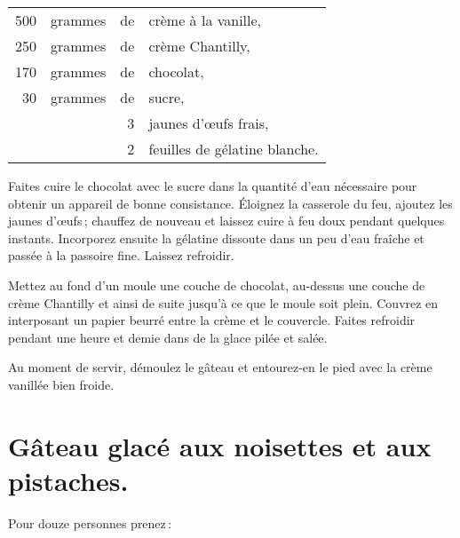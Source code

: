 \footnotesize
\begin{longtable}{rrrp{16em}}
    500 & grammes & de & crème à la vanille,                                                              \\
    250 & grammes & de & crème Chantilly,                                                                 \\
    170 & grammes & de & chocolat,                                                                        \\
     30 & grammes & de & sucre,                                                                           \\
        &         &  3 & jaunes d'œufs frais,                                                             \\
        &         &  2 & feuilles de gélatine blanche.                                                    \\
\end{longtable}
\normalsize

Faites cuire le chocolat avec le sucre dans la quantité d’eau nécessaire pour
obtenir un appareil de bonne consistance. Éloignez la casserole du feu, ajoutez
les jaunes d'œufs ; chauffez de nouveau et laissez cuire à feu doux pendant
quelques instants. Incorporez ensuite la gélatine dissoute dans un peu d'eau
fraîche et passée à la passoire fine. Laissez refroidir.

Mettez au fond d'un moule une couche de chocolat, au-dessus une couche de crème
Chantilly et ainsi de suite jusqu'à ce que le moule soit plein. Couvrez en
interposant un papier beurré entre la crème et le couvercle. Faites refroidir
pendant une heure et demie dans de la glace pilée et salée.

Au moment de servir, démoulez le gâteau et entourez-en le pied avec la crème
vanillée bien froide.

\section*{\centering Gâteau glacé aux noisettes et aux pistaches.}
{}

Pour douze personnes prenez :

